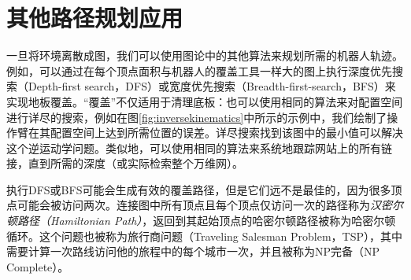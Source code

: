
\section{其他路径规划应用}
一旦将环境离散成图，我们可以使用图论中的其他算法来规划所需的机器人轨迹。例如，可以通过在每个顶点面积与机器人的覆盖工具一样大的图上执行深度优先搜索（Depth-first search，DFS）或宽度优先搜索（Breadth-first-search，BFS）来实现地板覆盖。“覆盖”不仅适用于清理底板：也可以使用相同的算法来对配置空间进行详尽的搜索，例如在图\ref{fig:inversekinematics}中所示的示例中，我们绘制了操作臂在其配置空间上达到所需位置的误差。详尽搜索找到该图中的最小值可以解决这个逆运动学问题。类似地，可以使用相同的算法来系统地跟踪网站上的所有链接，直到所需的深度（或实际检索整个万维网）。


执行DFS或BFS可能会生成有效的覆盖路径，但是它们远不是最佳的，因为很多顶点可能会被访问两次。连接图中所有顶点且每个顶点仅访问一次的路径称为\emph{汉密尔顿路径（Hamiltonian Path）}，返回到其起始顶点的哈密尔顿路径被称为哈密尔顿循环。这个问题也被称为旅行商问题（Traveling Salesman Problem，TSP），其中需要计算一次路线访问他的旅程中的每个城市一次，并且被称为NP完备（NP Complete）。


